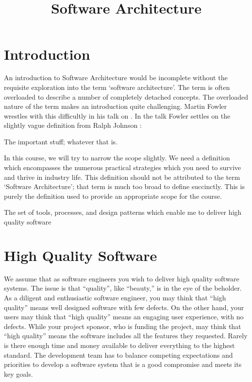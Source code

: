 \title{Software Architecture}

\maketitle

\section{Introduction}
An introduction to Software Architecture would be incomplete without the requisite
exploration into the term `software architecture'.
The term is often overloaded to describe a number of completely detached concepts.
The overloaded nature of the term makes an introduction quite challenging.
Martin Fowler wrestles with this difficultly in his talk on .
In the talk Fowler settles on the slightly vague definition from Ralph Johnson \cite{fowler-what-is-architecture}:

\begin{definition}
The important stuff; whatever that is.
\end{definition}

In this course, we will try to narrow the scope slightly.
We need a definition which encompasses the numerous practical strategies which you need to survive and thrive in industry life.
This definition should not be attributed to the term `Software Architecture'; that term is much too broad to define succinctly.
This is purely the definition used to provide an appropriate scope for the course.

\begin{definition}
The set of tools, processes, and design patterns which enable me to deliver high quality software
\end{definition}

\section{High Quality Software}
We assume that as software engineers you wish to deliver high quality software systems.
The issue is that ``quality'', like ``beauty,'' is in the eye of the beholder.
As a diligent and enthusiastic software engineer, you may think that ``high quality'' means well designed software with few defects.
On the other hand, your users may think that ``high quality'' means an engaging user experience, with no defects.
While your project sponsor, who is funding the project, may think that ``high quality'' means the software includes all the features they requested.
Rarely is there enough time and money available to deliver everything to the highest standard.
The development team has to balance competing expectations and priorities to develop a software system that is a good compromise and meets its key goals.

